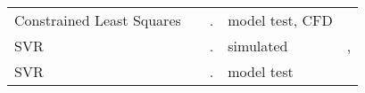 \begin{table}
\begin{tabular}{|p{4cm}|c|c|p{2cm}|p{5cm}|}
Constrained Least Squares
&&

.
&

model test, CFD
&

\cite{araki_estimating_2012}
\\

SVR
&&

.
&

simulated
&

\cite{zhu_parameter_2017}, \cite{wang_parameter_2021}
\\


SVR
&&

.
&

model test
&

\cite{luo_parameter_2016}
\\



\hline
\end{tabular}
    
\end{table}